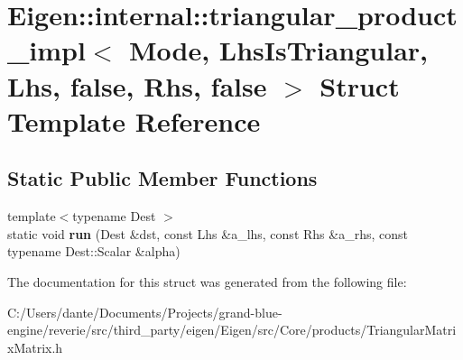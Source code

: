 \hypertarget{struct_eigen_1_1internal_1_1triangular__product__impl_3_01_mode_00_01_lhs_is_triangular_00_01_lh44afb66a9d3654cd1beb7f851ecab864}{}\section{Eigen\+::internal\+::triangular\+\_\+product\+\_\+impl$<$ Mode, Lhs\+Is\+Triangular, Lhs, false, Rhs, false $>$ Struct Template Reference}
\label{struct_eigen_1_1internal_1_1triangular__product__impl_3_01_mode_00_01_lhs_is_triangular_00_01_lh44afb66a9d3654cd1beb7f851ecab864}
\subsection*{Static Public Member Functions}
\begin{DoxyCompactItemize}
\item 
\mbox{\label{struct_eigen_1_1internal_1_1triangular__product__impl_3_01_mode_00_01_lhs_is_triangular_00_01_lh44afb66a9d3654cd1beb7f851ecab864_a94a33a21f729a7ce916ea08ddd0c56f4}} 
{\footnotesize template$<$typename Dest $>$ }\\static void {\bfseries run} (Dest \&dst, const Lhs \&a\+\_\+lhs, const Rhs \&a\+\_\+rhs, const typename Dest\+::\+Scalar \&alpha)
\end{DoxyCompactItemize}


The documentation for this struct was generated from the following file\+:\begin{DoxyCompactItemize}
\item 
C\+:/\+Users/dante/\+Documents/\+Projects/grand-\/blue-\/engine/reverie/src/third\+\_\+party/eigen/\+Eigen/src/\+Core/products/Triangular\+Matrix\+Matrix.\+h\end{DoxyCompactItemize}
